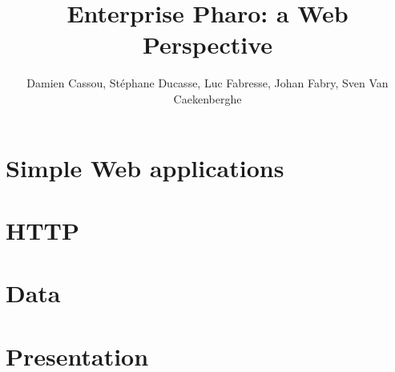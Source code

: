 \documentclass[10pt,twoside]{support/latex/sbabook}
\begin{document}
\frontmatter
\author{Damien Cassou, Stéphane Ducasse, Luc Fabresse, Johan Fabry, Sven Van Caekenberghe}
\title{Enterprise Pharo: a Web Perspective}
\maketitle
\tableofcontents

\sloppy %
\mainmatter



\part{Simple Web applications}







\part{HTTP}














\part{Data}











\part{Presentation}




\end{document}
